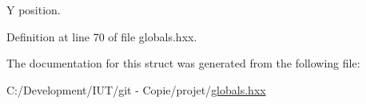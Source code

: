 Y position. 



Definition at line 70 of file globals.\-hxx.



The documentation for this struct was generated from the following file\-:\begin{DoxyCompactItemize}
\item 
C\-:/\-Development/\-I\-U\-T/git -\/ Copie/projet/\hyperlink{globals_8hxx}{globals.\-hxx}\end{DoxyCompactItemize}
